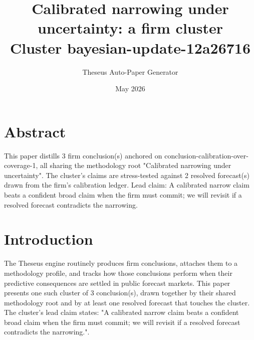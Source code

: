 \documentclass[11pt,letterpaper]{article}
\title{\textbf{Calibrated narrowing under uncertainty: a firm cluster}\\[6pt]\large Cluster bayesian-update-12a26716}
\date{May 2026}
\author{Theseus Auto-Paper Generator}
\begin{document}
\maketitle
\thispagestyle{empty}

\begin{center}
\end{center}

\vspace{1.5em}

\section*{Abstract}
This paper distills 3 firm conclusion(s) anchored on conclusion-calibration-over-coverage-1, all sharing the methodology root "Calibrated narrowing under uncertainty". The cluster's claims are stress-tested against 2 resolved forecast(s) drawn from the firm's calibration ledger. Lead claim: A calibrated narrow claim beats a confident broad claim when the firm must commit; we will revisit if a resolved forecast contradicts the narrowing.

\section{Introduction}
The Theseus engine routinely produces firm conclusions, attaches them to a methodology profile, and tracks how those conclusions perform when their predictive consequences are settled in public forecast markets. This paper presents one such cluster of 3 conclusion(s), drawn together by their shared methodology root and by at least one resolved forecast that touches the cluster. The cluster's lead claim states: "A calibrated narrow claim beats a confident broad claim when the firm must commit; we will revisit if a resolved forecast contradicts the narrowing.".
\end{document}

